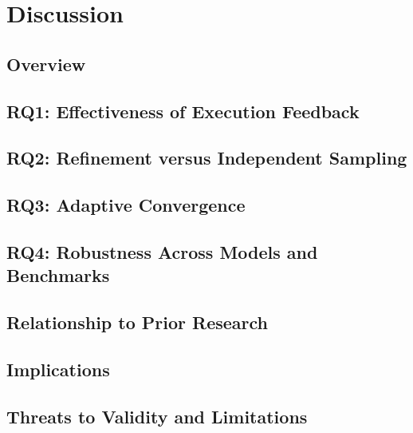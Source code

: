 \chapter{Discussion}

\section{Overview}

\section{RQ1: Effectiveness of Execution Feedback}

\section{RQ2: Refinement versus Independent Sampling}

\section{RQ3: Adaptive Convergence}

\section{RQ4: Robustness Across Models and Benchmarks}

\section{Relationship to Prior Research}

\section{Implications}

\section{Threats to Validity and Limitations}